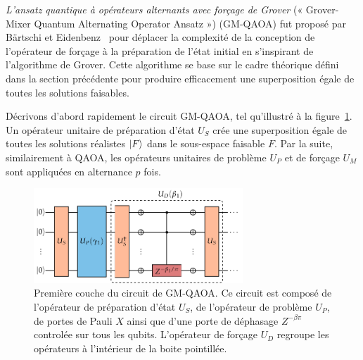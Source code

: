 \textit{L'ansatz quantique à opérateurs alternants avec forçage de Grover} (« Grover-Mixer Quantum Alternating Operator Ansatz ») (GM-QAOA) fut proposé par Bärtschi et Eidenbenz~\cite{bartschiGroverMixersQAOA2020} pour déplacer la complexité de la conception de l'opérateur de forçage à la préparation de l'état initial en s'inspirant de l'algorithme de Grover. Cette algorithme se base sur le cadre théorique défini dans la section précédente pour produire efficacement une superposition égale de toutes les solutions faisables.

Décrivons d'abord rapidement le circuit GM-QAOA, tel qu'illustré à la figure~\ref{fig:gm-qaoa}. Un opérateur unitaire de préparation d'état $U_{S}$ crée une superposition égale de toutes les solutions réalistes $\ket{F}$ dans le sous-espace faisable $F$. Par la suite, similairement à QAOA, les opérateurs unitaires de problème $U_{P}$ et de forçage $U_{M}$ sont appliquées en alternance $p$ fois.

\begin{figure}[ht!]
    \centering
    \includegraphics[width=0.7\textwidth]{figures/gm-qaoa}
    \caption[Circuit de l'ansatz quantique à opérateurs alternants avec forçage de Grover]{Première couche du circuit de GM-QAOA. Ce circuit est composé de l'opérateur de préparation d'état $U_{S}$, de l'opérateur de problème $U_{P}$, de portes de Pauli $X$ ainsi que d'une porte de déphasage $Z^{-\beta \pi}$ controlée sur tous les qubits. L'opérateur de forçage $U_{D}$ regroupe les opérateurs à l'intérieur de la boite pointillée.}
    \label{fig:gm-qaoa}
\end{figure}

